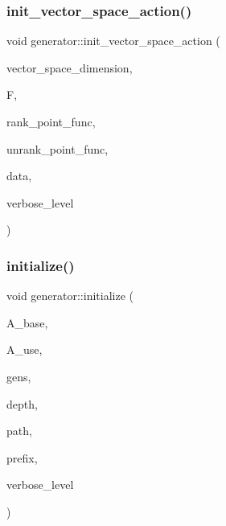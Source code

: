 \subsubsection{\texorpdfstring{init\+\_\+vector\+\_\+space\+\_\+action()}{init\_vector\_space\_action()}}
{\footnotesize\ttfamily void generator\+::init\+\_\+vector\+\_\+space\+\_\+action (\begin{DoxyParamCaption}\item[{\mbox{\hyperlink{galois_8h_a09fddde158a3a20bd2dcadb609de11dc}{I\+NT}}}]{vector\+\_\+space\+\_\+dimension,  }\item[{\mbox{\hyperlink{classfinite__field}{finite\+\_\+field}} $\ast$}]{F,  }\item[{\mbox{\hyperlink{galois_8h_a09fddde158a3a20bd2dcadb609de11dc}{I\+NT}}($\ast$)(\mbox{\hyperlink{galois_8h_a09fddde158a3a20bd2dcadb609de11dc}{I\+NT}} $\ast$\mbox{\hyperlink{simeon_8_c_aeb3f3030944801b163bc3b829a7f6710}{v}}, void $\ast$data)}]{rank\+\_\+point\+\_\+func,  }\item[{void($\ast$)(\mbox{\hyperlink{galois_8h_a09fddde158a3a20bd2dcadb609de11dc}{I\+NT}} $\ast$\mbox{\hyperlink{simeon_8_c_aeb3f3030944801b163bc3b829a7f6710}{v}}, \mbox{\hyperlink{galois_8h_a09fddde158a3a20bd2dcadb609de11dc}{I\+NT}} rk, void $\ast$data)}]{unrank\+\_\+point\+\_\+func,  }\item[{void $\ast$}]{data,  }\item[{\mbox{\hyperlink{galois_8h_a09fddde158a3a20bd2dcadb609de11dc}{I\+NT}}}]{verbose\+\_\+level }\end{DoxyParamCaption})}

\mbox{\label{classgenerator_af282f1bd802a758d990a7623af42d61c}} 
\subsubsection{\texorpdfstring{initialize()}{initialize()}}
{\footnotesize\ttfamily void generator\+::initialize (\begin{DoxyParamCaption}\item[{\mbox{\hyperlink{classaction}{action}} $\ast$}]{A\+\_\+base,  }\item[{\mbox{\hyperlink{classaction}{action}} $\ast$}]{A\+\_\+use,  }\item[{\mbox{\hyperlink{classstrong__generators}{strong\+\_\+generators}} $\ast$}]{gens,  }\item[{\mbox{\hyperlink{galois_8h_a09fddde158a3a20bd2dcadb609de11dc}{I\+NT}}}]{depth,  }\item[{const \mbox{\hyperlink{galois_8h_ab6cc7b4aeb6ea31aba2b3fbfc83ff5e6}{B\+Y\+TE}} $\ast$}]{path,  }\item[{const \mbox{\hyperlink{galois_8h_ab6cc7b4aeb6ea31aba2b3fbfc83ff5e6}{B\+Y\+TE}} $\ast$}]{prefix,  }\item[{\mbox{\hyperlink{galois_8h_a09fddde158a3a20bd2dcadb609de11dc}{I\+NT}}}]{verbose\+\_\+level }\end{DoxyParamCaption})}

